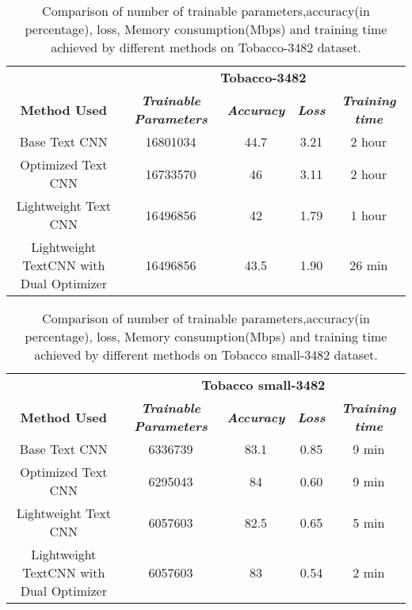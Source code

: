 \documentclass[conference]{IEEEtran}
\begin{document}
\begin{table*}[htbp]
\caption{Comparison of number of trainable parameters,accuracy(in percentage), loss, Memory consumption(Mbps) and training time achieved by different methods on Tobacco-3482 dataset.}
\begin{center}
\begin{tabular}{|c|c|c|c|c|}
\hline
\textbf{}&\multicolumn{4}{|c|}{\textbf{Tobacco-3482}} \\
\cline{2-5} 
\textbf{Method Used} & \textbf{\textit{Trainable Parameters}} & 
\textbf{\textit{Accuracy}} & \textbf{\textit{Loss}}&
\textbf{\textit{Training time}} \\
\hline
Base Text CNN & 16801034 &44.7 & 3.21 & 2 hour\\
\hline
Optimized Text CNN & 16733570 & 46 & 3.11 & 2 hour \\
\hline
Lightweight Text CNN & 16496856 & 42 & 1.79 & 1 hour\\
\hline
Lightweight TextCNN with Dual Optimizer & 16496856 & 43.5 & 1.90 & 26 min\\
\hline


\end{tabular}
\label{tab1}
\end{center}
\end{table*}

\begin{table*}[htbp]
\caption{Comparison of number of trainable parameters,accuracy(in percentage), loss, Memory consumption(Mbps) and training time achieved by different methods on Tobacco  small-3482 dataset.}
\begin{center}
\begin{tabular}{|c|c|c|c|c|}
\hline
\textbf{}&\multicolumn{4}{|c|}{\textbf{Tobacco small-3482}} \\
\cline{2-5} 
\textbf{Method Used} & \textbf{\textit{Trainable Parameters}} &

\textbf{\textit{Accuracy}} & \textbf{\textit{Loss}}&
\textbf{\textit{Training time}} \\
\hline
Base Text CNN & 6336739 & 83.1 & 0.85 & 9 min \\
\hline
Optimized Text CNN & 6295043 & 84& 0.60 & 9 min  \\
\hline
Lightweight Text CNN & 6057603 & 82.5 & 0.65 & 5 min\\
\hline
Lightweight TextCNN with Dual Optimizer & 6057603 & 83 & 0.54 & 2 min \\
\hline


\end{tabular}
\label{tab1}
\end{center}
\end{table*}
\end{document}
